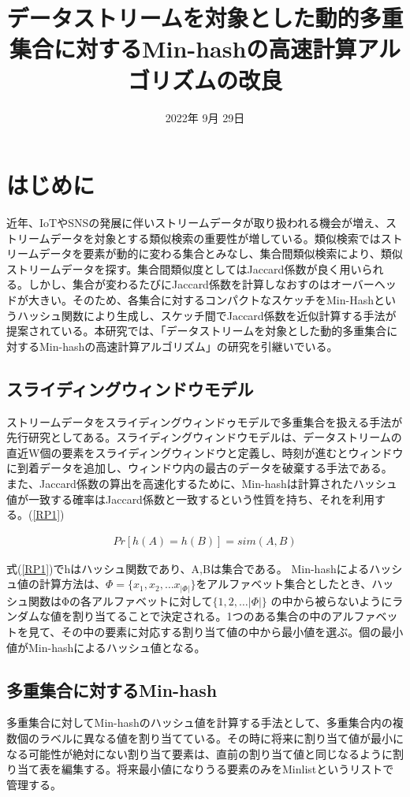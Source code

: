 \documentclass{interim} %
\date{2022年 9月 29日}
\title{データストリームを対象とした動的多重集合に対するMin-hashの高速計算アルゴリズムの改良}
\begin{document}
\maketitle

\section{はじめに}
近年、IoTやSNSの発展に伴いストリームデータが取り扱われる機会が増え、ストリームデータを対象とする類似検索の重要性が増している。類似検索ではストリームデータを要素が動的に変わる集合とみなし、集合間類似検索により、類似ストリームデータを探す。集合間類似度としてはJaccard係数が良く用いられる。しかし、集合が変わるたびにJaccard係数を計算しなおすのはオーバーヘッドが大きい。そのため、各集合に対するコンパクトなスケッチをMin-Hashというハッシュ関数により生成し、スケッチ間でJaccard係数を近似計算する手法が提案されている。本研究では、「データストリームを対象とした動的多重集合に対するMin-hashの高速計算アルゴリズム」の研究を引継いでいる。

\subsection{スライディングウィンドウモデル}
ストリームデータをスライディングウィンドゥモデルで多重集合を扱える手法が先行研究としてある。スライディングウィンドウモデルは、データストリームの直近W個の要素をスライディングウィンドウと定義し、時刻が進むとウィンドウに到着データを追加し、ウィンドウ内の最古のデータを破棄する手法である。
また、Jaccard係数の算出を高速化するために、Min-hashは計算されたハッシュ値が一致する確率はJaccard係数と一致するという性質を持ち、それを利用する。(\ref{RP1})

\begin{eqnarray}
\label{RP1}
Pr[h(A)=h(B)]=sim(A,B)
\end{eqnarray}

式(\ref{RP1})でhはハッシュ関数であり、A,Bは集合である。
Min-hashによるハッシュ値の計算方法は、$Φ=\{x_1,x_2,…x_{|Φ|}\}$をアルファベット集合としたとき、ハッシュ関数はΦの各アルファベットに対して$\{1,2,…|Φ|\}$ の中から被らないようにランダムな値を割り当てることで決定される。1つのある集合の中のアルファベットを見て、その中の要素に対応する割り当て値の中から最小値を選ぶ。個の最小値がMin-hashによるハッシュ値となる。

\subsection{多重集合に対するMin-hash}
多重集合に対してMin-hashのハッシュ値を計算する手法として、多重集合内の複数個のラベルに異なる値を割り当てている。その時に将来に割り当て値が最小になる可能性が絶対にない割り当て要素は、直前の割り当て値と同じなるように割り当て表を編集する。将来最小値になりうる要素のみをMinlistというリストで管理する。
\end{document}
